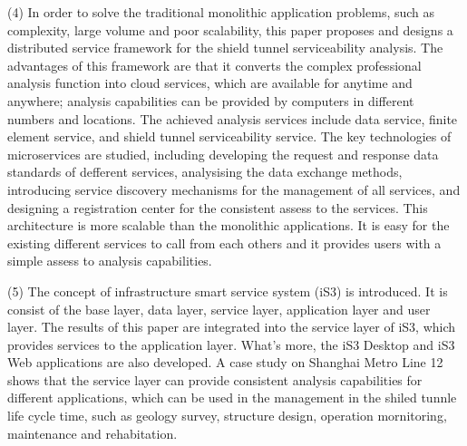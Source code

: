 \begin{eabstract}
(4) In order to solve the traditional monolithic application problems, such as complexity, large volume and poor scalability, this paper proposes and designs a distributed service framework for the shield tunnel serviceability analysis. The advantages of this framework are that it converts the complex professional analysis function into cloud services, which are available for anytime and anywhere; analysis capabilities can be provided by computers in different numbers and locations. The achieved analysis services include data service, finite element service, and shield tunnel serviceability service. The key technologies of microservices are studied, including developing the request and response data standards of defferent services, analysising the data exchange methods, introducing service discovery mechanisms for the management of all services, and designing a registration center for the consistent assess to the services. This architecture is more scalable than the monolithic applications. It is easy for the existing different services to call from each others and it provides users with a simple assess to analysis capabilities.

(5) The concept of infrastructure smart service system (iS3) is introduced. It is consist of the base layer, data layer, service layer, application layer and user layer. The results of this paper are integrated into the service layer of iS3, which provides services to the application layer. What's more, the iS3 Desktop and iS3 Web applications are also developed. A case study on Shanghai Metro Line 12 shows that the service layer can provide consistent analysis capabilities for different applications, which can be used in the management in the shiled tunnle life cycle time, such as geology survey, structure design, operation mornitoring, maintenance and rehabitation.

\end{eabstract}

